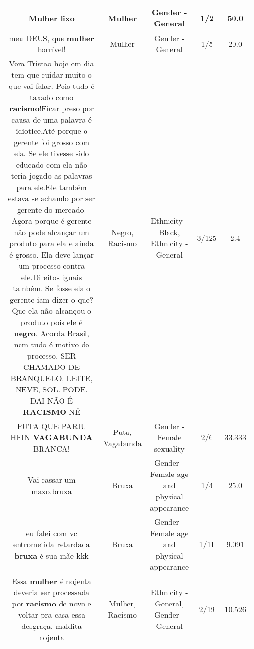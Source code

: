 \documentclass[11pt]{article}
\newlength\mylength
\begin{document}
\begin{center}
\begin{longtable}{|C{.65\mylength}|C{.30\mylength}|C{.12\mylength}|C{.12\mylength}|C{.12\mylength}|}
  \small Mulher lixo\normalsize   & Mulher & Gender - General & 1/2 & 50.0 \\  \hline
  \small meu DEUS, que \textbf{mulher}  horrível!\normalsize   & Mulher & Gender - General & 1/5 & 20.0 \\  \hline
  \small Vera Tristao hoje em dia tem que cuidar muito o que vai falar.  Pois tudo é taxado como \textbf{racismo}!Ficar preso por causa de uma palavra é idiotice.Até porque o gerente foi grosso com ela. Se ele tivesse sido educado  com ela não teria jogado as palavras para ele.Ele também estava se achando por ser gerente do mercado. Agora porque é gerente não pode alcançar um produto para ela e ainda é grosso. Ela deve lançar um processo contra ele.Direitos iguais também. Se fosse ela o gerente iam dizer o que?  Que ela não alcançou o produto pois ele é \textbf{negro}. Acorda Brasil,  nem tudo é motivo de processo. SER CHAMADO DE BRANQUELO,  LEITE, NEVE, SOL. PODE. DAI NÃO É \textbf{RACISMO} NÉ\normalsize   & Negro, Racismo & Ethnicity - Black, Ethnicity - General & 3/125 & 2.4 \\  \hline
  \small PUTA QUE PARIU HEIN \textbf{VAGABUNDA} BRANCA!\normalsize   & Puta, Vagabunda & Gender - Female sexuality & 2/6 & 33.333 \\  \hline
  \small Vai cassar um maxo.bruxa\normalsize   & Bruxa & Gender - Female age and physical appearance & 1/4 & 25.0 \\  \hline
  \small eu falei com vc entrometida retardada \textbf{bruxa} é sua mãe kkk\normalsize   & Bruxa & Gender - Female age and physical appearance & 1/11 & 9.091 \\  \hline
  \small Essa \textbf{mulher} é nojenta deveria ser processada por \textbf{racismo} de novo e voltar pra casa essa desgraça, maldita nojenta\normalsize   & Mulher, Racismo & Ethnicity - General, Gender - General & 2/19 & 10.526 \\  \hline

\end{longtable}
\end{center}
\end{document}

